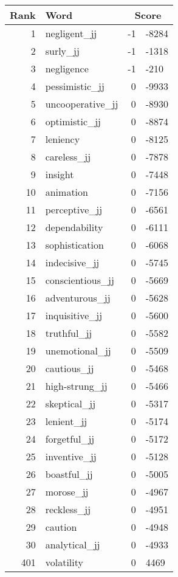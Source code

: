 \begin{longtable}[!htbp]{| rlr@{.}l |}
    \hline
    \textbf{Rank} & \textbf{Word} & \multicolumn{2}{c|}{\textbf{Score}} \\
    \hline
    \endhead
    1 & negligent\_jj & -1 & -8284 \\
    2 & surly\_jj & -1 & -1318 \\
    3 & negligence & -1 & -210 \\
    4 & pessimistic\_jj & 0 & -9933 \\
    5 & uncooperative\_jj & 0 & -8930 \\
    6 & optimistic\_jj & 0 & -8874 \\
    7 & leniency & 0 & -8125 \\
    8 & careless\_jj & 0 & -7878 \\
    9 & insight & 0 & -7448 \\
    10 & animation & 0 & -7156 \\
    11 & perceptive\_jj & 0 & -6561 \\
    12 & dependability & 0 & -6111 \\
    13 & sophistication & 0 & -6068 \\
    14 & indecisive\_jj & 0 & -5745 \\
    15 & conscientious\_jj & 0 & -5669 \\
    16 & adventurous\_jj & 0 & -5628 \\
    17 & inquisitive\_jj & 0 & -5600 \\
    18 & truthful\_jj & 0 & -5582 \\
    19 & unemotional\_jj & 0 & -5509 \\
    20 & cautious\_jj & 0 & -5468 \\
    21 & high-strung\_jj & 0 & -5466 \\
    22 & skeptical\_jj & 0 & -5317 \\
    23 & lenient\_jj & 0 & -5174 \\
    24 & forgetful\_jj & 0 & -5172 \\
    25 & inventive\_jj & 0 & -5128 \\
    26 & boastful\_jj & 0 & -5005 \\
    27 & morose\_jj & 0 & -4967 \\
    28 & reckless\_jj & 0 & -4951 \\
    29 & caution & 0 & -4948 \\
    30 & analytical\_jj & 0 & -4933 \\
    401 & volatility & 0 & 4469 \\

\end{longtable}
